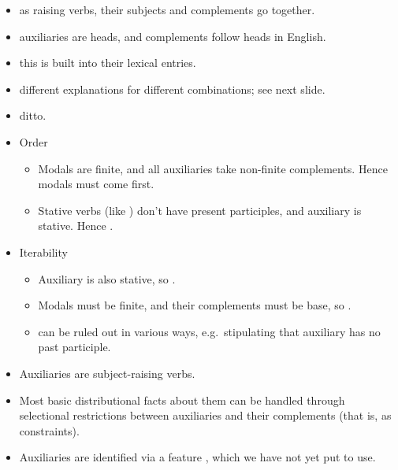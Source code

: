\documentclass[a4paper,landscape,headrule,footrule]{foils}
\begin{document}
\begin{itemize}\addtolength{\itemsep}{-0.5ex}
\item {} as raising verbs, their
  subjects and complements go together.
\item {} auxiliaries are
  heads, and complements follow heads in English.
\item {}
  this is built into their lexical entries.
\item {}
  different explanations for different combinations; see next slide.
\item {} ditto.
\end{itemize}

\begin{itemize}
\item Order
  \begin{itemize}
  \item Modals are finite, and all auxiliaries take non-finite
    complements.  Hence modals must come first.
  \item Stative verbs (like ) don’t have present participles,
    and auxiliary  is stative.  Hence .
  \end{itemize}
\item Iterability
  \begin{itemize}
  \item Auxiliary  is also stative, so .
  \item Modals must be finite, and their complements must be base, so
    .
  \item {} can be ruled out in various ways,
    e.g.\ stipulating that auxiliary  has no past participle.
  \end{itemize}
\end{itemize}

\begin{itemize}
\item Auxiliaries are subject-raising verbs.
\item Most basic distributional facts about them can be handled
  through selectional restrictions between auxiliaries and their
  complements (that is, as  constraints).
\item Auxiliaries are identified via a  feature ,
  which we have not yet put to use.
\end{itemize}
\end{document}
